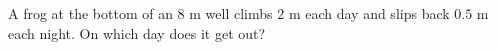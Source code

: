 A frog at the bottom of an $8$ m well climbs $2$ m each day and slips back $0.5$ m each night. On which day does it get out?
